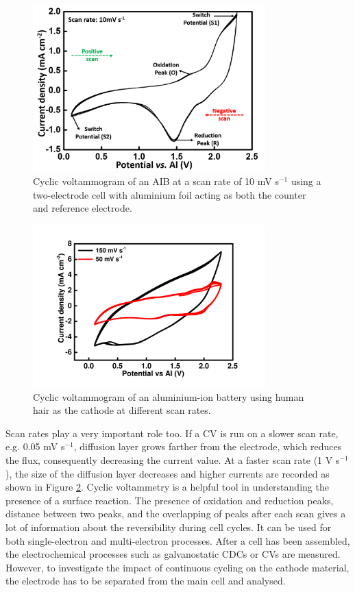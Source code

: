 \begin{figure}[tbh!]
\centering
\includegraphics[width=0.8\textwidth]{Figures/chap2fig/CV}
\caption{Cyclic voltammogram of an AIB at a scan rate of 10 mV s$^{-1}$ using a two-electrode cell with aluminium foil acting as both the counter and reference electrode.}
\label{Figures/chap2fig:CV}
\end{figure}

\begin{figure}[tbh!]
\centering
\includegraphics[width=0.8\textwidth]{Figures/chap2fig/scanrate.pdf}
\caption{Cyclic voltammogram of an aluminium-ion battery using human hair as the cathode at different scan rates.}
\label{Figures/chap2fig:scanrate}
\end{figure}

Scan rates play a very important role too. If a CV is run on a slower scan rate, e.g. 0.05 mV s$^{-1}$, diffusion layer grows farther from the electrode, which reduces the flux, consequently decreasing the current value. At a faster scan rate (1 V s$^{-1}$), the size of the diffusion layer decreases and higher currents are recorded as shown in Figure \ref{Figures/chap2fig:scanrate}. Cyclic voltammetry is a helpful tool in understanding the presence of a surface reaction. The presence of oxidation and reduction peaks, distance between two peaks, and the overlapping of peaks after each scan gives a lot of information about the reversibility during cell cycles. It can be used for both single-electron and multi-electron processes.  
After a cell has been assembled, the electrochemical processes such as galvanostatic CDCs or CVs are measured. However, to investigate the impact of continuous cycling on the cathode material, the electrode has to be separated from the main cell and analysed. 
